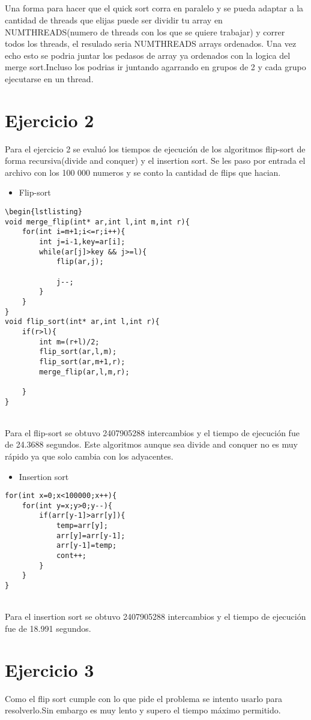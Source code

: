 \documentclass{article}
\begin{document}
\subsection{}
Una forma para hacer que el quick sort corra en paralelo y se pueda adaptar a la cantidad de threads que elijas puede ser dividir tu array en NUMTHREADS(numero de threads con los que se quiere trabajar) y correr todos los threads, el resulado seria NUMTHREADS arrays ordenados. Una vez echo esto se podria juntar los pedasos de array ya ordenados con la logica del merge sort.Incluso los podrias ir juntando agarrando en grupos de 2 y cada grupo ejecutarse en un thread.

\section{Ejercicio 2}
Para el ejercicio 2 se evaluó los tiempos de ejecución de los algoritmos flip-sort de forma recursiva(divide and conquer) y el insertion sort. Se les paso por entrada el archivo con los 100 000 numeros y se conto la cantidad de flips que hacian.\\
\begin{itemize}
    \item Flip-sort
\end{itemize}
\begin{lstlisting}
\begin{lstlisting}
void merge_flip(int* ar,int l,int m,int r){
    for(int i=m+1;i<=r;i++){
        int j=i-1,key=ar[i];
        while(ar[j]>key && j>=l){
            flip(ar,j);

            j--;
        }
    }
}
void flip_sort(int* ar,int l,int r){
    if(r>l){
        int m=(r+l)/2;
        flip_sort(ar,l,m);
        flip_sort(ar,m+1,r);
        merge_flip(ar,l,m,r);

    }
}

\end{lstlisting}\\
Para el flip-sort se obtuvo 2407905288 intercambios y el tiempo de ejecución fue de 24.3688 segundos. Este algoritmos aunque sea divide and conquer no es muy rápido ya que solo cambia con los adyacentes.
\begin{itemize}
    \item Insertion sort
\end{itemize}
\begin{lstlisting}
for(int x=0;x<100000;x++){
	for(int y=x;y>0;y--){
		if(arr[y-1]>arr[y]){
			temp=arr[y];
			arr[y]=arr[y-1];
			arr[y-1]=temp;
			cont++;
		}
	}
}
\end{lstlisting}\\
Para el insertion sort se obtuvo 2407905288 intercambios y el tiempo de ejecución fue de 18.991 segundos.

\section{Ejercicio 3}
Como el flip sort cumple con lo que pide el problema se intento usarlo para resolverlo.Sin embargo es muy lento y supero el tiempo máximo permitido.
\end{document}

